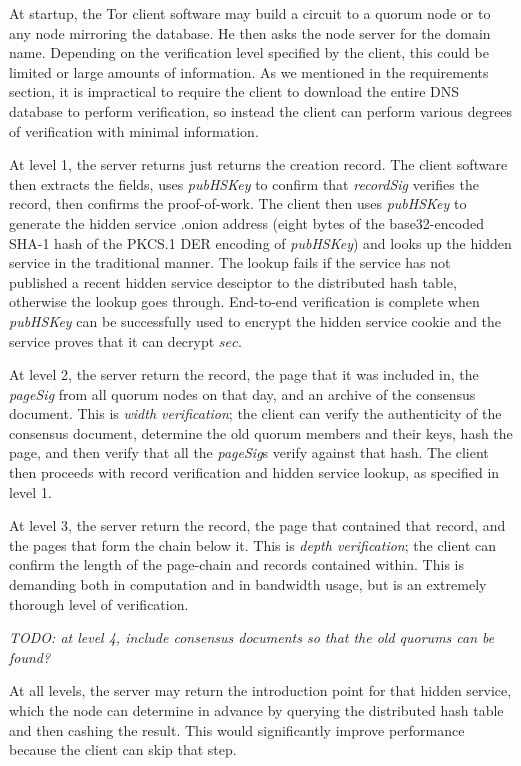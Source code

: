 At startup, the Tor client software may build a circuit to a quorum node or to any node mirroring the database. He then asks the node server for the domain name. Depending on the verification level specified by the client, this could be limited or large amounts of information. As we mentioned in the requirements section, it is impractical to require the client to download the entire DNS database to perform verification, so instead the client can perform various degrees of verification with minimal information.

At level 1, the server returns just returns the creation record. The client software then extracts the fields, uses \textit{pubHSKey} to confirm that \textit{recordSig} verifies the record, then confirms the proof-of-work. The client then uses \textit{pubHSKey} to generate the hidden service .onion address (eight bytes of the base32-encoded SHA-1 hash of the PKCS.1 DER encoding of \textit{pubHSKey}) and looks up the hidden service in the traditional manner. The lookup fails if the service has not published a recent hidden service desciptor to the distributed hash table, otherwise the lookup goes through. End-to-end verification is complete when \textit{pubHSKey} can be successfully used to encrypt the hidden service cookie and the service proves that it can decrypt $ sec $.

At level 2, the server return the record, the page that it was included in, the \textit{pageSig} from all quorum nodes on that day, and an archive of the consensus document. This is \textit{width verification}; the client can verify the authenticity of the consensus document, determine the old quorum members and their keys, hash the page, and then verify that all the \textit{pageSig}s verify against that hash. The client then proceeds with record verification and hidden service lookup, as specified in level 1.

At level 3, the server return the record, the page that contained that record, and the pages that form the chain below it. This is \textit{depth verification}; the client can confirm the length of the page-chain and records contained within. This is demanding both in computation and in bandwidth usage, but is an extremely thorough level of verification. 

\textit{TODO: at level 4, include consensus documents so that the old quorums can be found?}

At all levels, the server may return the introduction point for that hidden service, which the node can determine in advance by querying the distributed hash table and then cashing the result. This would significantly improve performance because the client can skip that step.


